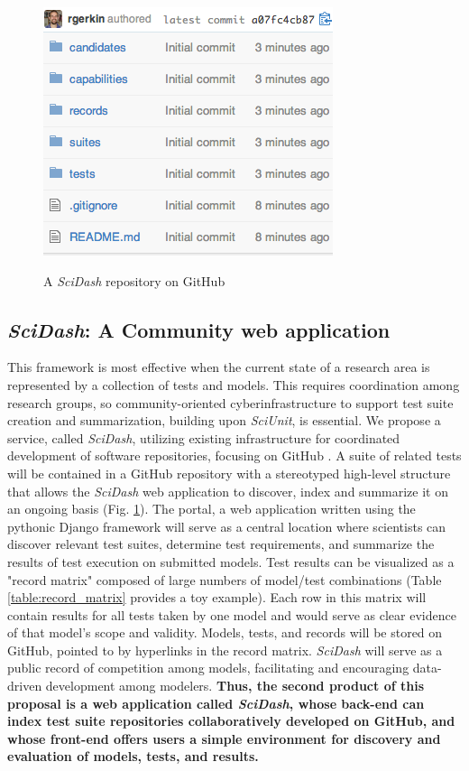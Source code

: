 \documentclass[11pt,letterpaper]{article}
\begin{document}
\begin{figure}
\centering
\includegraphics[scale=0.7]{scidash_github.png}
\label{fig:scidash_repo}
\caption{A \textit{SciDash} repository on GitHub}
\end{figure}
\leavevmode
{}    
\subsection{\textit{SciDash}: A Community web application}
This framework is most effective when the current state of a research area is represented by a collection of tests and models. This requires coordination among research groups, so community-oriented cyberinfrastructure to support test suite creation and summarization, building upon \textit{SciUnit}, is essential.
We propose a service, called \textit{SciDash}, utilizing existing infrastructure for coordinated development of software repositories, focusing on GitHub \cite{github_url} \cite{ram_git_2013}. A suite of related tests will be contained in a GitHub repository with a stereotyped high-level structure that allows the \textit{SciDash} web application to discover, index and summarize it on an ongoing basis (Fig. \ref{fig:scidash_repo}). The portal, a web application written using the pythonic Django framework \cite{django_url} will serve as a central location where scientists can discover relevant test suites, determine test requirements, and summarize the results of test execution on submitted models. Test results can be visualized as a "record matrix" composed of large numbers of model/test combinations (Table \ref{table:record_matrix} provides a toy example).  Each row in this matrix will contain results for all tests taken by one model and would serve as clear evidence of that model's scope and validity.  Models, tests, and records will be stored on GitHub, pointed to by hyperlinks in the record matrix. \textit{SciDash} will serve as a public record of competition among models, facilitating and encouraging data-driven development among modelers. \textbf{Thus, the second product of this proposal is a web application called \textit{SciDash}, whose back-end can index test suite repositories collaboratively developed on GitHub, and whose front-end offers users a simple environment for discovery and evaluation of models, tests, and results.}  
\end{document}
